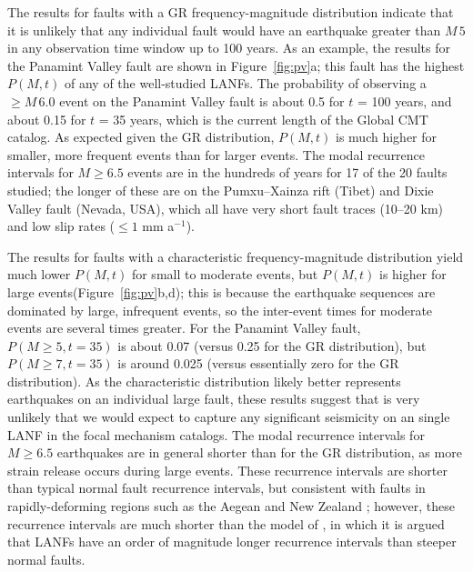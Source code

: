 \documentclass[draft,grl]{AGUTeX}
\begin{document}
\begin{article}
The results for faults with a GR frequency-magnitude distribution indicate that
it is unlikely that any individual fault would have an earthquake greater than
$M \, 5$ in any observation time window up to 100 years.  As an example, the
results for the Panamint Valley fault are shown in Figure~\ref{fig:pv}a; this
fault has the highest $P(M,t)$ of any of the well-studied LANFs.  The
probability of observing a $\ge M \, 6.0$ event on the Panamint Valley fault is
about 0.5 for $t$ = 100 years, and about 0.15 for $t$ = 35 years, which is the
current length of the Global CMT catalog. As expected given the GR
distribution, $P(M,t)$ is much higher for smaller, more frequent events
than for larger events. The modal recurrence intervals for $M\ge6.5$ events are
in the hundreds of years for 17 of the 20 faults studied; the longer of these
are on the Pumxu--Xainza rift (Tibet) and Dixie Valley fault (Nevada, USA),
which all have very short fault traces (10--20 km) and low slip rates ($\le 1$
mm a$^{-1}$).  

The results for faults with a characteristic frequency-magnitude distribution
yield much lower $P(M,t)$ for small to moderate events, but $P(M,t)$ is higher
for large events(Figure~\ref{fig:pv}b,d); this is because the earthquake
sequences are dominated by large, infrequent events, so the inter-event times
for moderate events are several times greater. For the Panamint Valley fault,
$P(M\ge5,t=35)$ is about 0.07 (versus 0.25 for the GR distribution), but
$P(M\ge 7, t=35)$ is around 0.025 (versus essentially zero for the GR
distribution). As the characteristic distribution likely better represents
earthquakes on an individual large fault, these results suggest that is very
unlikely that we would expect to capture any significant seismicity on an
single LANF in the focal mechanism catalogs. The modal recurrence intervals for
$M\ge6.5$ earthquakes are in general shorter than for the GR distribution, as
more strain release occurs during large events. These recurrence intervals are
shorter than typical normal fault recurrence intervals, but consistent with
faults in rapidly-deforming regions such as the Aegean and New Zealand
\citep{nicol05}; however, these recurrence intervals are much shorter than the
model of \citet{wernicke1995seis}, in which it is argued that LANFs have an
order of magnitude longer recurrence intervals than steeper normal faults.


\end{article}
\end{document}
